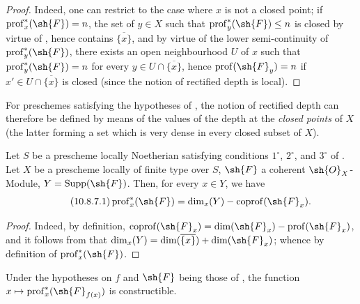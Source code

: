 \begin{proof}
Indeed, one can restrict to the case where $x$ is not a closed point; if $\operatorname{prof}^*_x(\sh{F})=n$, the set of $y\in X$ such that $\operatorname{prof}^*_y(\sh{F})\leq n$ is closed by virtue of , hence contains $\overline{\{x\}}$, and by virtue of the lower semi-continuity of $\operatorname{prof}^*_y(\sh{F})$, there exists an open neighbourhood $U$ of $x$ such that $\operatorname{prof}^*_y(\sh{F})=n$ for every $y\in U\cap\overline{\{x\}}$, hence $\operatorname{prof}(\sh{F}_y)=n$ if $x'\in U\cap\overline{\{x\}}$ is closed (since the notion of rectified depth is local).
\end{proof}

For preschemes satisfying the hypotheses of , the notion of rectified depth can therefore be defined by means of the values of the depth at the \emph{closed points} of $X$ (the latter forming a set which is very dense in every closed subset of $X$).

\begin{proposition}[10.8.7]
\label{IV.10.8.7}
Let $S$ be a prescheme locally Noetherian satisfying conditions $1^\circ$, $2^\circ$, and $3^\circ$ of .
Let $X$ be a prescheme locally of finite type over $S$, $\sh{F}$ a coherent $\sh{O}_X$-Module, $Y=\operatorname{Supp}(\sh{F})$.
Then, for every $x\in Y$, we have
\begin{equation}
\label{IV.10.8.7.1}
\tag{10.8.7.1}
\operatorname{prof}^*_x(\sh{F})=\dim_x(Y)-\operatorname{coprof}(\sh{F}_x).
\end{equation}
\end{proposition}

\begin{proof}
Indeed, by definition, $\operatorname{coprof}(\sh{F}_x)=\dim(\sh{F}_x)-\operatorname{prof}(\sh{F}_x)$, and it follows from  that $\dim_x(Y)=\dim(\overline{\{x\}})+\dim(\sh{F}_x)$; whence  by definition of $\operatorname{prof}^*_x(\sh{F})$.
\end{proof}

\begin{corollary}[10.8.8]
\label{IV.10.8.8}
Under the hypotheses on $f$ and $\sh{F}$ being those of , the function $x\mapsto\operatorname{prof}^*_x(\sh{F}_{f(x)})$ is constructible.
\end{corollary}

